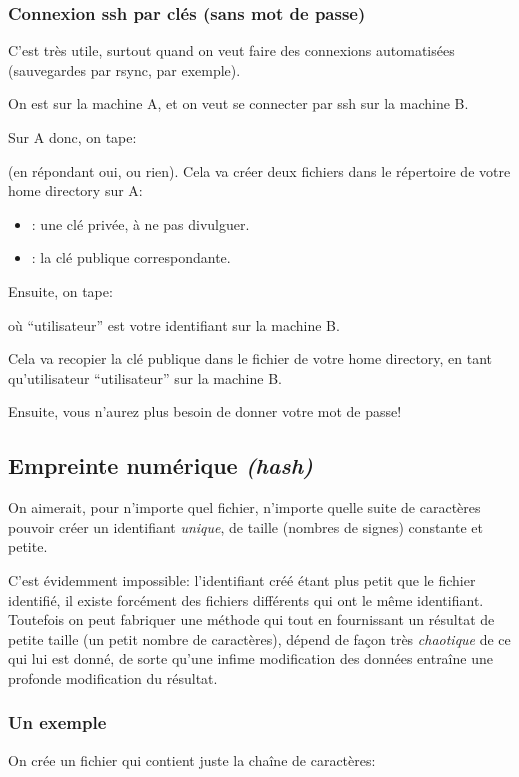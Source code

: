 \subsubsection{Connexion ssh par clés (sans mot de passe)}
C'est très utile, surtout quand on veut faire des connexions
automatisées (sauvegardes par rsync, par exemple).

On est sur la machine A, et on veut se connecter par ssh sur la
machine B.

Sur A donc, on tape:

 (en répondant oui, ou rien). Cela va créer
deux fichiers dans le répertoire  de votre home directory
sur A:


\begin{itemize}
\item {}: une clé privée, à ne pas divulguer.
\item {}: la clé publique correspondante.
\end{itemize}

Ensuite, on tape:


où ``utilisateur'' est votre identifiant sur la machine B.

Cela va recopier la clé publique  dans le fichier
 de votre home directory, en tant
qu'utilisateur ``utilisateur'' sur la machine B.

Ensuite, vous n'aurez plus besoin de donner votre mot de passe!

\subsection{Empreinte numérique \textsl{(hash)}}
On aimerait, pour n'importe quel fichier, n'importe quelle suite de
caractères pouvoir créer un identifiant \emph{unique}, de taille
(nombres de signes) constante et petite.

C'est évidemment impossible: l'identifiant créé étant plus petit que
le fichier identifié, il existe forcément des fichiers différents qui
ont le même identifiant. Toutefois on peut fabriquer une méthode qui
tout en fournissant un résultat de petite taille (un petit nombre de
caractères), dépend de façon très \emph{chaotique} de ce qui lui est
donné, de sorte qu'une infime modification des données entraîne une
profonde modification du résultat.

\subsubsection{Un exemple}
On crée un fichier  qui contient juste la chaîne de
caractères:

